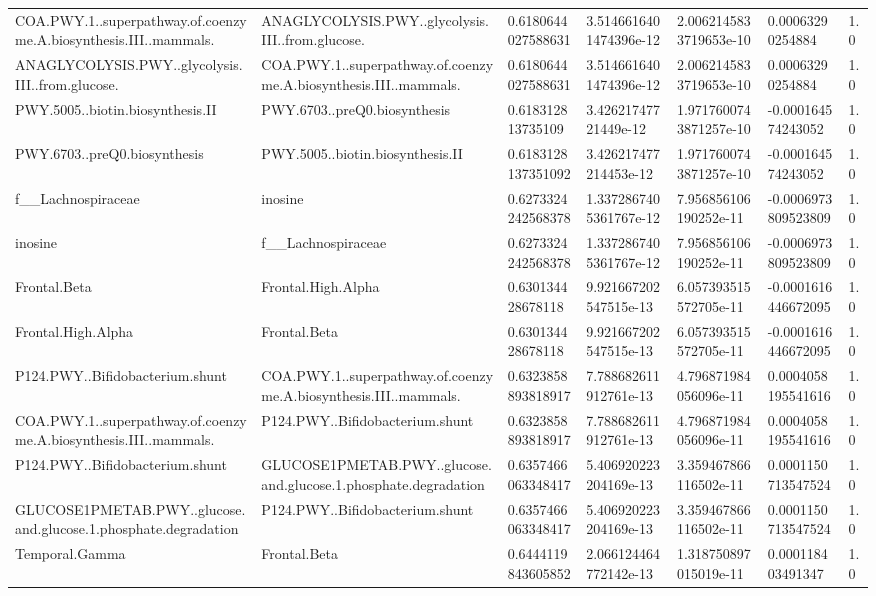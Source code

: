 \begin{longtable}{lllllll}
COA.PWY.1..superpathway.of.coenzyme.A.biosynthesis.III..mammals. & ANAGLYCOLYSIS.PWY..glycolysis.III..from.glucose. & 0.6180644027588631 & 3.5146616401474396e-12 & 2.0062145833719653e-10 & 0.00063290254884 & 1.0 \\
ANAGLYCOLYSIS.PWY..glycolysis.III..from.glucose. & COA.PWY.1..superpathway.of.coenzyme.A.biosynthesis.III..mammals. & 0.6180644027588631 & 3.5146616401474396e-12 & 2.0062145833719653e-10 & 0.00063290254884 & 1.0 \\
PWY.5005..biotin.biosynthesis.II & PWY.6703..preQ0.biosynthesis & 0.618312813735109 & 3.42621747721449e-12 & 1.9717600743871257e-10 & -0.000164574243052 & 1.0 \\
PWY.6703..preQ0.biosynthesis & PWY.5005..biotin.biosynthesis.II & 0.6183128137351092 & 3.426217477214453e-12 & 1.9717600743871257e-10 & -0.000164574243052 & 1.0 \\
f\_\_Lachnospiraceae & inosine & 0.6273324242568378 & 1.3372867405361767e-12 & 7.956856106190252e-11 & -0.0006973809523809 & 1.0 \\
inosine & f\_\_Lachnospiraceae & 0.6273324242568378 & 1.3372867405361767e-12 & 7.956856106190252e-11 & -0.0006973809523809 & 1.0 \\
Frontal.Beta & Frontal.High.Alpha & 0.630134428678118 & 9.921667202547515e-13 & 6.057393515572705e-11 & -0.0001616446672095 & 1.0 \\
Frontal.High.Alpha & Frontal.Beta & 0.630134428678118 & 9.921667202547515e-13 & 6.057393515572705e-11 & -0.0001616446672095 & 1.0 \\
P124.PWY..Bifidobacterium.shunt & COA.PWY.1..superpathway.of.coenzyme.A.biosynthesis.III..mammals. & 0.6323858893818917 & 7.788682611912761e-13 & 4.796871984056096e-11 & 0.0004058195541616 & 1.0 \\
COA.PWY.1..superpathway.of.coenzyme.A.biosynthesis.III..mammals. & P124.PWY..Bifidobacterium.shunt & 0.6323858893818917 & 7.788682611912761e-13 & 4.796871984056096e-11 & 0.0004058195541616 & 1.0 \\
P124.PWY..Bifidobacterium.shunt & GLUCOSE1PMETAB.PWY..glucose.and.glucose.1.phosphate.degradation & 0.6357466063348417 & 5.406920223204169e-13 & 3.359467866116502e-11 & 0.0001150713547524 & 1.0 \\
GLUCOSE1PMETAB.PWY..glucose.and.glucose.1.phosphate.degradation & P124.PWY..Bifidobacterium.shunt & 0.6357466063348417 & 5.406920223204169e-13 & 3.359467866116502e-11 & 0.0001150713547524 & 1.0 \\
Temporal.Gamma & Frontal.Beta & 0.6444119843605852 & 2.066124464772142e-13 & 1.318750897015019e-11 & 0.000118403491347 & 1.0 \\

\end{longtable}
